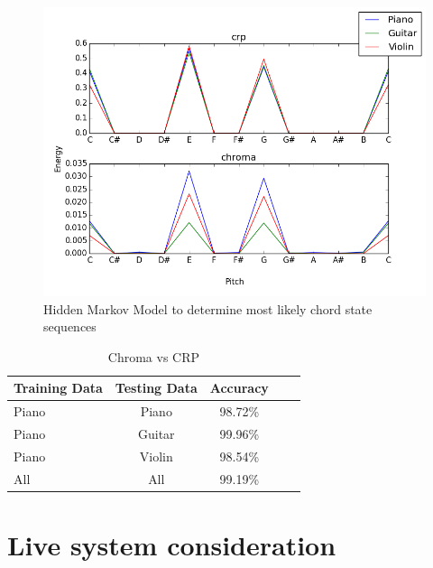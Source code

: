 \documentclass{article}
\begin{document}
\begin{figure}[ht]
\vskip 0.2in
\begin{center}
\centerline{\includegraphics[width=\columnwidth]{chromacrp}}
\caption{Hidden Markov Model to determine most likely chord state sequences}
\label{icml-historical}
\end{center}
\vskip -0.2in
\end{figure}

\begin{table}[t]
\caption{Chroma vs CRP}
\label{chromavscrp}
\vskip 0.15in
\begin{center}
\begin{small}
\begin{sc}
\begin{tabular}{lcccr}
\hline
\abovespace\belowspace
Training Data & Testing Data & Accuracy \\
\hline
\abovespace
Piano & Piano & 98.72\%\\
Piano & Guitar & 99.96\%\\
Piano & Violin & 98.54\%\\
All & All & 99.19\%\\
\hline
\end{tabular}
\end{sc}
\end{small}
\end{center}
\vskip -0.1in
\end{table}

\section{Live system consideration}
\end{document}
